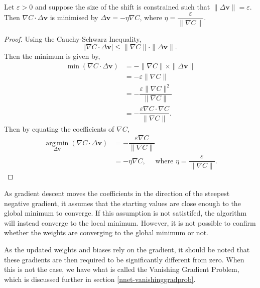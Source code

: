 \begin{proposition}\label{nnets-graddescminproof}
	Let $\varepsilon > 0$ and suppose the size of the shift is constrained such that $\|\Delta\mathbf{v}\| = \varepsilon$. Then $\nabla C \cdot \Delta\mathbf{v}$ is minimised by $\Delta\mathbf{v} = -\eta\nabla C$, where $\eta = \dfrac{\varepsilon}{\|\nabla C\|}$.
\end{proposition}

\begin{proof}
	Using the Cauchy-Schwarz Inequality,
	\[
			|\nabla C\cdot\Delta\mathbf{v}| \le \|\nabla C\|\cdot\|\Delta\mathbf{v}\|.
	\]
	Then the minimum is given by, \begin{align*}
		\min(\nabla C\cdot\Delta\mathbf{v}) & = -\|\nabla C\|\times\|\Delta\mathbf{v}\| \\
		& = -\varepsilon\|\nabla C\| \\
		& = -\dfrac{\varepsilon\|\nabla C\|^2}{\|\nabla C\|} \\
		& = -\dfrac{\varepsilon\nabla C\cdot\nabla C}{\|\nabla C\|}.
	\end{align*}
	Then by equating the coefficients of $\nabla C$,
	\begin{align*}
		\operatorname*{arg\,min}_{\Delta\mathbf{v}}(\nabla C\cdot\Delta\mathbf{v}) & = -\dfrac{\varepsilon\nabla C}{\|\nabla C\|} \\
		& = -\eta\nabla C,\quad\text{ where }\eta = \dfrac{\varepsilon}{\|\nabla C\|}.
	\end{align*}
\end{proof}

As gradient descent moves the coefficients in the direction of the steepest negative gradient, it assumes that the starting values are close enough to the global minimum to converge. If this assumption is not satistifed, the algorithm will instead converge to the local minimum. However, it is not possible to confirm whether the weights are converging to the global minimum or not.

%

As the updated weights and biases rely on the gradient, it should be noted that these gradients are then required to be significantly different from zero. When this is not the case, we have what is called the Vanishing Gradient Problem, which is discussed further in section \ref{nnet-vanishinggradprob}.

